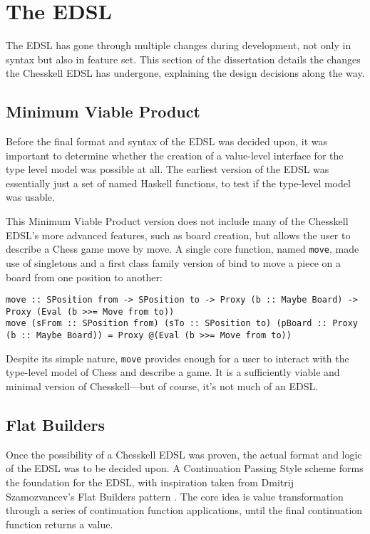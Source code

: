 \documentclass[12pt, a4paper, bibliography=totocnumbered]{scrreprt}
\newcommand{\inline}[1]{\lstinline[basicstyle=\ttfamily\footnotesize]{#1}}
\begin{document}
\section{The EDSL}

The EDSL has gone through multiple changes during development, not only in syntax but also in feature set. This section of the dissertation details the changes the Chesskell EDSL has undergone, explaining the design decisions along the way.

\subsection{Minimum Viable Product}

Before the final format and syntax of the EDSL was decided upon, it was important to determine whether the creation of a value-level interface for the type level model was possible at all. The earliest version of the EDSL was essentially just a set of named Haskell functions, to test if the type-level model was usable.

This Minimum Viable Product version does not include many of the Chesskell EDSL's more advanced features, such as board creation, but allows the user to describe a Chess game move by move. A single core function, named \inline{move}, made use of singletons and a first class family version of bind to move a piece on a board from one position to another:

\begin{lstlisting}
move :: SPosition from -> SPosition to -> Proxy (b :: Maybe Board) -> Proxy (Eval (b >>= Move from to))
move (sFrom :: SPosition from) (sTo :: SPosition to) (pBoard :: Proxy (b :: Maybe Board)) = Proxy @(Eval (b >>= Move from to))
\end{lstlisting}

Despite its simple nature, \inline{move} provides enough for a user to interact with the type-level model of Chess and describe a game. It is a sufficiently viable and minimal version of Chesskell---but of course, it's not much of an EDSL.

\subsection{Flat Builders}

Once the possibility of a Chesskell EDSL was proven, the actual format and logic of the EDSL was to be decided upon. A Continuation Passing Style \cite{cps} scheme forms the foundation for the EDSL, with inspiration taken from Dmitrij Szamozvancev's Flat Builders pattern \cite{mezzo}. The core idea is value transformation through a series of continuation function applications, until the final continuation function returns a value.
\end{document}
